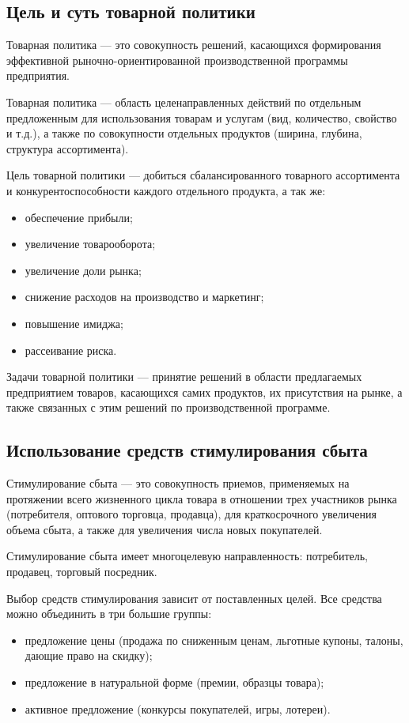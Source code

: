 \documentclass[a4paper,12pt,oneside,final]{extarticle}
\numberwithin{equation}{section}
\begin{document}
\subsection{Цель и суть товарной политики}
Товарная политика --- это совокупность решений, касающихся формирования эффективной рыночно-ориентированной производственной программы предприятия.

Товарная политика ­­--- область целенаправленных действий по отдельным предложенным для использования товарам и услугам (вид, количество, свойство и т.д.), а также по совокупности отдельных продуктов (ширина, глубина, структура ассортимента).

Цель товарной политики --- добиться сбалансированного товарного ассортимента и конкурентоспособности каждого отдельного продукта, а так же:
\begin{itemize}
	\item обеспечение прибыли;
	\item увеличение товарооборота;
	\item увеличение доли рынка;
	\item снижение расходов на производство и маркетинг;
	\item повышение имиджа;
	\item рассеивание риска.
\end{itemize}

Задачи товарной политики --- принятие решений в области предлагаемых предприятием товаров, касающихся самих продуктов, их присутствия на рынке, а также связанных с этим решений по производственной программе.

\subsection{Использование средств стимулирования сбыта}
Стимулирование сбыта --- это совокупность приемов, применяемых на протяжении всего жизненного цикла товара в отношении трех участников рынка (потребителя, оптового торговца, продавца), для краткосрочного увеличения объема сбыта, а также для увеличения числа новых покупателей.

Стимулирование сбыта имеет многоцелевую направленность: потребитель, продавец, торговый посредник.

Выбор средств стимулирования зависит от поставленных целей. 
Все средства можно объединить в три большие группы:
\begin{itemize}
	\item предложение цены (продажа по сниженным ценам, льготные купоны, талоны, дающие право на скидку);
	\item предложение в натуральной форме (премии, образцы товара);
	\item активное предложение (конкурсы покупателей, игры, лотереи).
\end{itemize}
\end{document}
